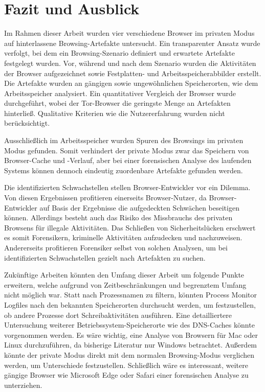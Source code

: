 \chapter{Fazit und Ausblick}\label{chap:Fazit-Ausblick}
\thispagestyle{plain.scrheadings}
\ohead{\headmark}

Im Rahmen dieser Arbeit wurden vier verschiedene Browser im privaten Modus auf hinterlassene Browsing-Artefakte untersucht. Ein transparenter Ansatz wurde verfolgt, bei dem ein Browsing-Szenario definiert und erwartete Artefakte festgelegt wurden. Vor, während und nach dem Szenario wurden die Aktivitäten der Browser aufgezeichnet sowie Festplatten- und Arbeitsspeicherabbilder erstellt. Die Artefakte wurden an gängigen sowie ungewöhnlichen Speicherorten, wie dem Arbeitsspeicher analysiert. Ein quantitativer Vergleich der Browser wurde durchgeführt, wobei der Tor-Browser die geringste Menge an Artefakten hinterließ. Qualitative Kriterien wie die Nutzererfahrung wurden nicht berücksichtigt.

Ausschließlich im Arbeitsspeicher wurden Spuren des Browsings im privaten Modus gefunden. Somit verhindert der private Modus zwar das Speichern von Browser-Cache und -Verlauf, aber bei einer forensischen Analyse des laufenden Systems können dennoch eindeutig zuordenbare Artefakte gefunden werden.

Die identifizierten Schwachstellen stellen Browser-Entwickler vor ein Dilemma.
Von diesen Ergebnissen profitieren einerseits Browser-Nutzer, da Browser-Entwickler auf Basis der Ergebnisse die aufgedeckten Schwächen beseitigen können.
Allerdings besteht auch das Risiko des Missbrauchs des privaten Browsens für illegale Aktivitäten.
Das Schließen von Sicherheitslücken erschwert es somit Forensikern, kriminelle Aktivitäten aufzudecken und nachzuweisen. 
Andererseits profitieren Forensiker selbst von solchen Analysen, um bei identifizierten Schwachstellen gezielt nach Artefakten zu suchen. 

Zukünftige Arbeiten könnten den Umfang dieser Arbeit um folgende Punkte erweitern, welche aufgrund von Zeitbeschränkungen und begrenztem Umfang nicht möglich war. Statt nach Prozessnamen zu filtern, könnten Process Monitor Logfiles nach den bekannten Speicherorten durchsucht werden, um festzustellen, ob andere Prozesse dort Schreibaktivitäten ausführen. Eine detailliertere Untersuchung weiterer Betriebssystem-Speicherorte wie des DNS-Caches könnte vorgenommen werden. Es wäre wichtig, eine Analyse von Browsern für Mac oder Linux durchzuführen, da bisherige Literatur nur Windows betrachtet. Außerdem könnte der private Modus direkt mit dem normalen Browsing-Modus verglichen werden, um Unterschiede festzustellen. Schließlich wäre es interessant, weitere gängige Browser wie Microsoft Edge oder Safari einer forensischen Analyse zu unterziehen.

